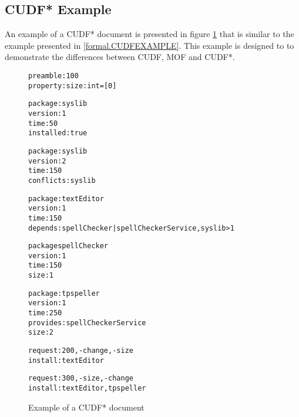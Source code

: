 \subsection{CUDF* Example}
\label{formal.cudfstarexample}
An example of a CUDF* document is presented in figure \ref{formal.CUDFstarEXAMPLE} that is similar to the example presented in \ref{formal.CUDFEXAMPLE}.
This example is designed to to demonstrate the differences between CUDF, MOF and CUDF*.

\begin{figure}[htp] 
\begin{center}
\begin{alltt}
preamble: 100
property: size: int = [0]

package: syslib
version: 1
time: 50
installed: true

package: syslib
version: 2
time: 150
conflicts: syslib

package: textEditor
version: 1
time: 150
depends: spellChecker | spellCheckerService, syslib > 1

package spellChecker
version: 1
time: 150
size: 1

package: tpspeller
version: 1
time: 250
provides: spellCheckerService
size: 2

request: 200, -change,-size
install:textEditor

request: 300, -size,-change
install: textEditor, tpspeller

\end{alltt}
  \caption[CUDF* Example]{Example of a CUDF* document}
  \label{formal.CUDFstarEXAMPLE}
\end{center}
\end{figure} 

